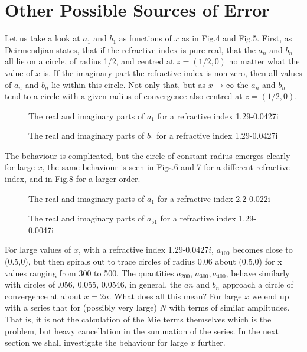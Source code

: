 \documentclass[12pt]{article}
\begin{document}
\section{Other Possible Sources of Error}

Let us take a look at $a_1$ and $b_1$ as functions of $x$ as in Fig.4 and Fig.5.
First, as Deirmendjian states, that if the refractive index is pure real, that
the $a_n$ and $b_n$ all lie on a circle, of radius 1/2, and centred at $z=(1/2,0)$
no matter what the value of $x$ is. If the imaginary part the refractive index is 
non zero, then all values of $a_n$ and $b_n$ lie within this circle. Not only 
that, but as $x \rightarrow \infty$ the $a_n$ and $b_n$ tend to a circle with
a given radius of convergence also centred at $z=(1/2,0)$.

\vspace*{14cm}
\begin{figure}[htb]
\caption{ The real and imaginary parts of $a_1$ for a refractive index 1.29-0.0427i }
\end{figure}
\vspace*{14cm}
\begin{figure}[htb]
\caption{ The real and imaginary parts of $b_1$ for a refractive index 1.29-0.0427i }
\end{figure}
The behaviour is complicated, but the circle of constant radius emerges clearly
for large $x$, the same behaviour is seen in Figs.6 and 7 for a different refractive 
index, and in Fig.8 for a larger order.
\vspace*{14cm}
\begin{figure}[htb]
\caption{ The real and imaginary parts of $a_1$ for a refractive index 2.2-0.022i }
\end{figure}
\vspace*{14cm}
\begin{figure}[htb]
\caption{ The real and imaginary parts of $a_{51}$ for a refractive index 1.29-0.0047i }
\end{figure}

For large values of $x$, with a refractive index 1.29-0.0427$i$, $a_{100}$
 becomes close to (0.5,0), but then spirals out to trace circles of radius 0.06 about (0.5,0) for x values ranging from
 300 to 500. The quantities $a_{200}$, $a_{300}, a_{400}$,  behave similarly
   with circles of .056, 0.055, 0.0546, in general, the $an$ and $b_n$ approach a 
circle of convergence at about $x=2n$.
What does all this mean? For large $x$ we end up with a series that for 
(possibly very large) $N$ with terms of similar amplitudes. That is, it is not the 
calculation of the Mie terms themselves which is the problem, but heavy cancellation
in the summation of the series. In the next section we shall investigate the behaviour for
large $x$ further.
\end{document}
